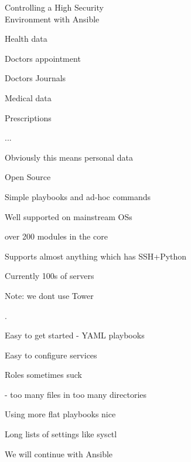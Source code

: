 \documentclass[17pt,Screen16to9,footrule]{foils}
\begin{document}

\mytitlepage
{Controlling a High Security \\Environment with Ansible}


\LogoOn



\begin{list1}
\item Health data
\item Doctors appointment
\item Doctors Journals
\item Medical data
\item Prescriptions
\item ...
\item Obviously this means personal data
\end{list1}




\begin{list1}
\item Open Source \smiley
\item Simple playbooks and ad-hoc commands
\item Well supported on mainstream OSs
\item over 200 modules in the core
\item Supports almost anything which has SSH+Python
\item Currently 100s of servers
\end{list1}


Note: we dont use Tower


.
\begin{list1}
\item Easy to get started - YAML playbooks
\item Easy to configure services
\item Roles sometimes suck
\item - too many files in too many directories
\item Using more flat playbooks nice
\item Long lists of settings like sysctl
\item We will continue with Ansible
\end{list1}
\end{document}
